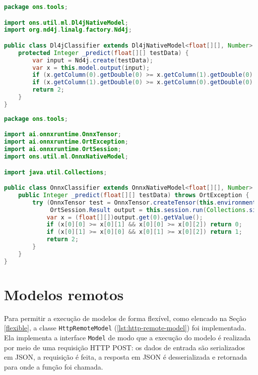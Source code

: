 \begin{lstlisting}[language=Java, caption=Implementação da classe Dl4jClassifier, label={lst:dl4j-classifier}]
package ons.tools;

import ons.util.ml.Dl4jNativeModel;
import org.nd4j.linalg.factory.Nd4j;

public class Dl4jClassifier extends Dl4jNativeModel<float[][], Number> {
    protected Integer _predict(float[][] testData) {
        var input = Nd4j.create(testData);
        var x = this.model.output(input);
        if (x.getColumn(0).getDouble(0) >= x.getColumn(1).getDouble(0) && x.getColumn(0).getDouble(0) >= x.getColumn(2).getDouble(0)) return 0;
        if (x.getColumn(1).getDouble(0) >= x.getColumn(0).getDouble(0) && x.getColumn(1).getDouble(0) >= x.getColumn(2).getDouble(0)) return 1;
        return 2;
    }
}
\end{lstlisting}

\begin{lstlisting}[language=Java, caption=Implementação da classe OnnxClassifier, label={lst:onnx-classifier}]
package ons.tools;

import ai.onnxruntime.OnnxTensor;
import ai.onnxruntime.OrtException;
import ai.onnxruntime.OrtSession;
import ons.util.ml.OnnxNativeModel;

import java.util.Collections;

public class OnnxClassifier extends OnnxNativeModel<float[][], Number> {
    public Integer _predict(float[][] testData) throws OrtException {
        try (OnnxTensor test = OnnxTensor.createTensor(this.environment, testData);
             OrtSession.Result output = this.session.run(Collections.singletonMap(this.inputName, test))) {
            var x = (float[][])output.get(0).getValue();
            if (x[0][0] >= x[0][1] && x[0][0] >= x[0][2]) return 0;
            if (x[0][1] >= x[0][0] && x[0][1] >= x[0][2]) return 1;
            return 2;
        }
    }
}
\end{lstlisting}



\section{Modelos remotos}
\label{appendix-ons-remote-model}

Para permitir a execução de modelos de forma flexível, como elencado na Seção \ref{flexible}, a classe \texttt{HttpRemoteModel} (\ref{lst:http-remote-model}) foi implementada. Ela implementa a interface \texttt{Model} de modo que a execução do modelo é realizada por meio de uma requisição HTTP POST: os dados de entrada são serializados em JSON, a requisição é feita, a resposta em JSON é desserializada e retornada para onde a função foi chamada.

